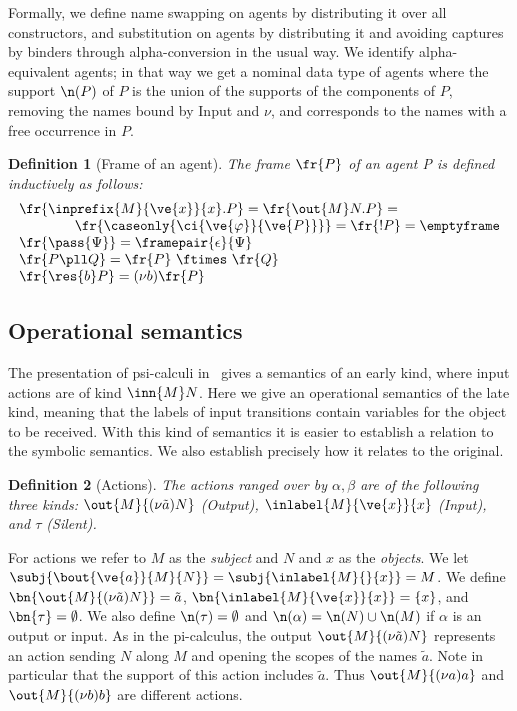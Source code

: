 \documentclass{eptcs}
\newtheorem{definition}{Definition}
\theoremstyle{definition}
\begin{document}
Formally, we define name swapping on agents by distributing it over all constructors, and substitution on agents by distributing it and avoiding captures by binders through alpha-conversion in the usual way. We identify alpha-equivalent agents; in that way we get a nominal data type of agents where
the support $\n(P)$ of $P$ is the union of
the supports of the components of $P$, removing the names bound by Input and
$\nu$, and corresponds to the names with a free occurrence in $P$.


\begin{definition}[Frame of an agent]
The {\em frame $\fr{P}$ of an agent} P is defined inductively as follows:
\[\begin{array}{l}
\fr{\inprefix{M}{\ve{x}}{x}.P} = \fr{\out{M}N.P} = \\
\qquad \qquad \fr{\caseonly{\ci{\ve{\varphi}}{\ve{P}}}} =
\fr{!P} = \emptyframe \\
\fr{\pass{\Psi}} = \framepair{\epsilon}{\Psi} \\
\fr{P \pll Q} = \fr{P}\ \ftimes\ \fr{Q}\\
\fr{\res{b}P} = (\nu b)\fr{P}  \\
\end{array}\]
\end{definition}

\subsection{Operational semantics}

The presentation of psi-calculi in~\cite{bengtson.johansson.ea:psi-calculi} gives a semantics of an early kind, where input actions are of kind $\inn{M}N$. 
Here we give an operational semantics of the late kind, meaning that
the labels of input transitions contain variables for the object to be
received. With this kind of semantics it is easier to establish a
relation to the symbolic semantics. We also establish precisely how it
relates to the original.


\begin{definition}[Actions]

The {\em actions} ranged over by $\alpha, \beta$ are of the following three kinds:
$\out{M}{(\nu \tilde{a})N}$ (Output), $\inlabel{M}{\ve{x}}{x}$ (Input), and
$\tau$ (Silent).





\end{definition}

For actions we refer to $M$ as the {\em subject} and $N$ and $x$ as the {\em
objects}. We let $\subj{\bout{\ve{a}}{M}{N}} =
\subj{\inlabel{M}{}{x}} = M$. We define 
$\bn{\out{M}{(\nu \tilde{a})N}} = \tilde{a}$, 
$\bn{\inlabel{M}{\ve{x}}{x}} = \{x\}$, 
and $\bn{\tau}=\emptyset$. We also define $\n(\tau)=\emptyset$ and
$\n(\alpha) = \n(N) \cup \n(M)$ if $\alpha$ is an output or input.
As in the pi-calculus, the output $\out{M}{(\nu \tilde{a})N}$ represents an
action sending $N$ along $M$ and opening the scopes of the names $\tilde{a}$. 
Note in particular that the support of this action includes  $\tilde{a}$. Thus 
$\out{M}{(\nu a)a}$ and $\out{M}{(\nu b)b}$ are different actions.
\end{document}
